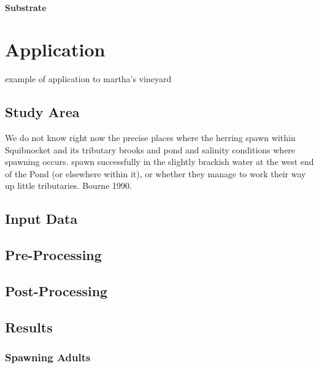 \documentclass[
]{book}
\begin{document}
\hypertarget{substrate-11}{%
\subsubsection{Substrate}\label{substrate-11}}

\hypertarget{application}{%
\chapter{Application}\label{application}}

example of application to martha's vineyard

\hypertarget{study-area}{%
\section{Study Area}\label{study-area}}

We do not know right now the precise
places where the herring spawn within Squibnocket
and its tributary brooks and pond and salinity conditions where spawning occurs. spawn successfully in the slightly brackish water
at the west end of the Pond (or elsewhere within
it), or whether they manage to work their way up
little tributaries. Bourne 1990.

\hypertarget{input-data}{%
\section{Input Data}\label{input-data}}

\hypertarget{pre-processing}{%
\section{Pre-Processing}\label{pre-processing}}

\hypertarget{post-processing}{%
\section{Post-Processing}\label{post-processing}}

\hypertarget{results}{%
\section{Results}\label{results}}

\hypertarget{spawning-adults-2}{%
\subsection{Spawning Adults}\label{spawning-adults-2}}
\end{document}
